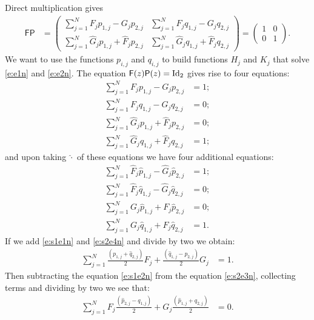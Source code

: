 \documentclass[11pt]{amsart}
\begin{document}
Direct multiplication gives
\begin{align*}
\mathsf{F}\mathsf{P} & =
\left(
\begin{array}{cc}
 \displaystyle\sum_{j=1}^{N}F_j p_{1,j}-G_j p_{2,j} & \displaystyle\sum_{j=1}^{N}F_j q_{1,j} - G_j q_{2,j} \\
\displaystyle \sum_{j=1}^{N}\hat G_j p_{1,j} + \hat F_j p_{2,j}  & \displaystyle\sum_{j=1}^{N}\hat G_j q_{1,j} + \hat F_j q_{2,j}
\end{array}
\right)=
\left(
\begin{array}{cc}
 1 & 0 \\
 0 & 1
\end{array}
\right).
\end{align*}
We want to use the functions $p_{i,j}$ and $q_{i,j}$ to build functions $H_j$ and $K_j$ that solve \eqref{e:e1n} and \eqref{e:e2n}.
The equation $\mathsf{F}(z)\mathsf{P}(z)=\textnormal{Id}_2$ gives rise to four equations:
\begin{align}
 \sum_{j=1}^{N} F_j p_{1,j} - G_j p_{2,j}   & = 1;\label{e:s1e1n}\\
 \sum_{j=1}^{N} F_j q_{1,j} - G_j q_{2,j} & = 0;\label{e:s1e2n}\\
 \sum_{j=1}^{N} \hat G_j p_{1,j} + \hat F_j p_{2,j} & = 0;\label{e:s1e3n}\\
 \sum_{j=1}^{N} \hat G_j q_{1,j} + \hat F_j q_{2,j}   & = 1;\label{e:s1e4n}
\end{align}
and upon taking $\hat{\cdot}$ of these equations we have four additional equations:
\begin{align}
 \sum_{j=1}^{N}\hat F_j \hat p_{1,j} - \hat G_j \hat p_{2,j}  & = 1;\label{e:s2e1n}\\
 \sum_{j=1}^{N}\hat F_j \hat q_{1,j} - \hat G_j \hat q_{2,j} & = 0;\label{e:s2e2n}\\
 \sum_{j=1}^{N} G_j \hat p_{1,j} + F_j \hat p_{2,j} & = 0;\label{e:s2e3n}\\
 \sum_{j=1}^{N} G_j \hat q_{1,j} + F_j \hat q_{2,j}  & = 1.\label{e:s2e4n}
\end{align}
If we add \eqref{e:s1e1n} and \eqref{e:s2e4n} and divide by two we obtain:
\begin{align}
\label{e:s3e1n}\sum_{j=1}^{N}\frac{(p_{1,j}+\hat{q}_{2,j})}{2}F_j+\frac{(\hat q_{1,j} - p_{2,j})}{2}G_j  & = 1.
\end{align}
Then subtracting the equation \eqref{e:s1e2n} from the equation \eqref{e:s2e3n}, collecting terms and dividing by two we see that:
\begin{align}
\label{e:s3e3n}  \sum_{j=1}^{N}F_j\frac{(\hat p_{2,j} - q_{1,j})}{2} + G_j\frac{(\hat{p}_{1,j}+q_{2,j})}{2} & =0.
\end{align}
\end{document}
